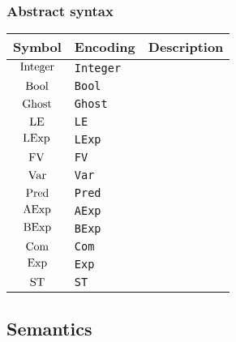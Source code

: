 \documentclass[11pt]{article}
\begin{document}
\subsubsection{Abstract syntax}

\begin{table}[H]
	\def\arraystretch{1.5}
	\begin{tabular}{c l l}
		\textbf{Symbol} & \textbf{Encoding} & \textbf{Description} \\
		\hline 
		$\mathrm{Integer}$ & \texttt{Integer} &  \\
		$\mathrm{Bool}$ & \texttt{Bool} &  \\
		$\mathrm{Ghost}$ & \texttt{Ghost} &  \\
		$\mathrm{LE}$ & \texttt{LE} &  \\
		$\mathrm{LExp}$ & \texttt{LExp} &  \\
		$\mathrm{FV}$ & \texttt{FV} &  \\
		$\mathrm{Var}$ & \texttt{Var} &  \\
		$\mathrm{Pred}$ & \texttt{Pred} &  \\
		$\mathrm{AExp}$ & \texttt{AExp} &  \\
		$\mathrm{BExp}$ & \texttt{BExp} &  \\
		$\mathrm{Com}$ & \texttt{Com} &  \\
		$\mathrm{Exp}$ & \texttt{Exp} &  \\
		$\mathrm{ST}$ & \texttt{ST} &  \\
	\end{tabular} 
\end{table} 

\subsection{Semantics}
\end{document}
